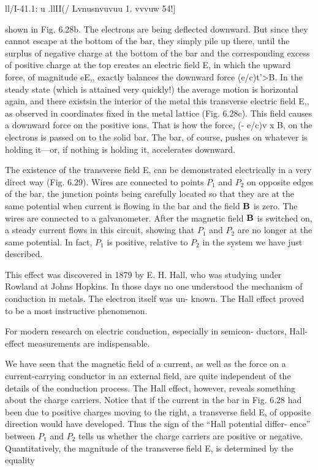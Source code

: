 \/ll/I-41.1: u .llII(/ Lvnusnvuvuu 1. vvvuw 54!]

shown in Fig. 6.28b. The electrons are being deflected downward.
But since they cannot escape at the bottom of the bar, they simply
pile up there, until the surplus of negative charge at the bottom of the
bar and the corresponding excess of positive charge at the top creates
an electric field E, in which the upward force, of magnitude eE,,
exactly balances the downward force (e/c)t'>B. In the steady state
(which is attained very quickly!) the average motion is horizontal
again, and there existsin the interior of the metal this transverse
electric field E,, as observed in coordinates fixed in the metal lattice
(Fig. 6.28c). This field causes a downward force on the positive
ions. That is how the force, (- e/c)v x B, on the electrons is passed
on to the solid bar. The bar, of course, pushes on whatever is holding
it---or, if nothing is holding it, accelerates downward.

The existence of the transverse field E, can be demonstrated electrically
in a very direct way (Fig. 6.29). Wires are connected to
points $P_1$ and $P_2$ on opposite edges of the bar, the junction points
being carefully located so that they are at the same potential when
current is flowing in the bar and the field $\mathbf{B}$ is zero. The wires are
connected to a galvanometer. After the magnetic field $\mathbf{B}$ is switched
on, a steady current flows in this circuit, showing that $P_1$ and $P_2$ are
no longer at the same potential. In fact, $P_1$ is positive, relative to $P_2$
in the system we have just described.

This effect was discovered in 1879 by E. H. Hall, who was studying
under Rowland at Johns Hopkins. In those days no one understood
the mechanism of conduction in metals. The electron itself was un-
known. The Hall effect proved to be a most instructive phenomenon.

 

For modern research on electric conduction, especially in semicon-
ductors, Hall-effect measurements are indispensable.

We have seen that the magnetic field of a current, as well as the
force on a current-carrying conductor in an external field, are quite
independent of the details of the conduction process. The Hall
effect, however, reveals something about the charge carriers. Notice
that if the current in the bar in Fig. 6.28 had been due to positive
charges moving to the right, a transverse field E, of opposite direction
would have developed. Thus the sign of the ``Hall potential differ-
ence'' between $P_1$ and $P_2$ tells us whether the charge carriers are positive
or negative. Quantitatively, the magnitude of the transverse
field E, is determined by the equality

